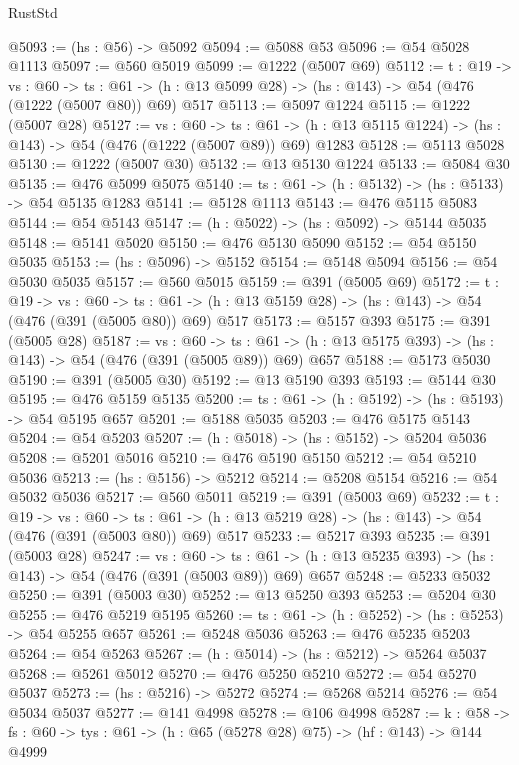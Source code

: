 \begin{lexlean}{RustStd}
\begin{coremodule}
@5093 := (hs : @56) -> @5092
@5094 := @5088 @53
@5096 := @54 @5028 @1113
@5097 := @560 @5019
@5099 := @1222 (@5007 @69)
@5112 := {t : @19} ->
  {vs : @60} ->
  {ts : @61} -> (h : @13 @5099 @28) -> (hs : @143) -> @54 (@476 (@1222 (@5007 @80)) @69) @517
@5113 := @5097 @1224
@5115 := @1222 (@5007 @28)
@5127 := {vs : @60} ->
  {ts : @61} -> (h : @13 @5115 @1224) -> (hs : @143) -> @54 (@476 (@1222 (@5007 @89)) @69) @1283
@5128 := @5113 @5028
@5130 := @1222 (@5007 @30)
@5132 := @13 @5130 @1224
@5133 := @5084 @30
@5135 := @476 @5099 @5075
@5140 := {ts : @61} -> (h : @5132) -> (hs : @5133) -> @54 @5135 @1283
@5141 := @5128 @1113
@5143 := @476 @5115 @5083
@5144 := @54 @5143
@5147 := (h : @5022) -> (hs : @5092) -> @5144 @5035
@5148 := @5141 @5020
@5150 := @476 @5130 @5090
@5152 := @54 @5150 @5035
@5153 := (hs : @5096) -> @5152
@5154 := @5148 @5094
@5156 := @54 @5030 @5035
@5157 := @560 @5015
@5159 := @391 (@5005 @69)
@5172 := {t : @19} ->
  {vs : @60} ->
  {ts : @61} -> (h : @13 @5159 @28) -> (hs : @143) -> @54 (@476 (@391 (@5005 @80)) @69) @517
@5173 := @5157 @393
@5175 := @391 (@5005 @28)
@5187 := {vs : @60} ->
  {ts : @61} -> (h : @13 @5175 @393) -> (hs : @143) -> @54 (@476 (@391 (@5005 @89)) @69) @657
@5188 := @5173 @5030
@5190 := @391 (@5005 @30)
@5192 := @13 @5190 @393
@5193 := @5144 @30
@5195 := @476 @5159 @5135
@5200 := {ts : @61} -> (h : @5192) -> (hs : @5193) -> @54 @5195 @657
@5201 := @5188 @5035
@5203 := @476 @5175 @5143
@5204 := @54 @5203
@5207 := (h : @5018) -> (hs : @5152) -> @5204 @5036
@5208 := @5201 @5016
@5210 := @476 @5190 @5150
@5212 := @54 @5210 @5036
@5213 := (hs : @5156) -> @5212
@5214 := @5208 @5154
@5216 := @54 @5032 @5036
@5217 := @560 @5011
@5219 := @391 (@5003 @69)
@5232 := {t : @19} ->
  {vs : @60} ->
  {ts : @61} -> (h : @13 @5219 @28) -> (hs : @143) -> @54 (@476 (@391 (@5003 @80)) @69) @517
@5233 := @5217 @393
@5235 := @391 (@5003 @28)
@5247 := {vs : @60} ->
  {ts : @61} -> (h : @13 @5235 @393) -> (hs : @143) -> @54 (@476 (@391 (@5003 @89)) @69) @657
@5248 := @5233 @5032
@5250 := @391 (@5003 @30)
@5252 := @13 @5250 @393
@5253 := @5204 @30
@5255 := @476 @5219 @5195
@5260 := {ts : @61} -> (h : @5252) -> (hs : @5253) -> @54 @5255 @657
@5261 := @5248 @5036
@5263 := @476 @5235 @5203
@5264 := @54 @5263
@5267 := (h : @5014) -> (hs : @5212) -> @5264 @5037
@5268 := @5261 @5012
@5270 := @476 @5250 @5210
@5272 := @54 @5270 @5037
@5273 := (hs : @5216) -> @5272
@5274 := @5268 @5214
@5276 := @54 @5034 @5037
@5277 := @141 @4998
@5278 := @106 @4998
@5287 := {k : @58} ->
  {fs : @60} -> {tys : @61} -> (h : @65 (@5278 @28) @75) -> (hf : @143) -> @144 @4999

\end{coremodule}
\end{lexlean}
